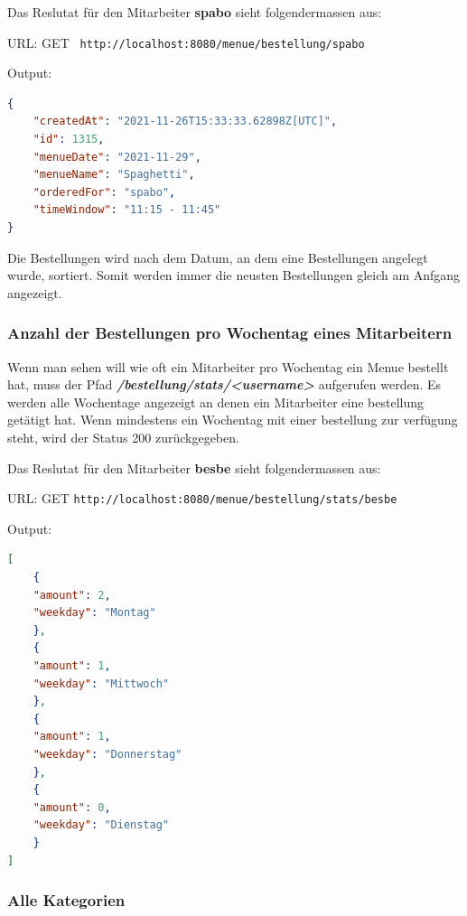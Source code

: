 Das Reslutat für den Mitarbeiter \textbf{spabo} sieht folgendermassen aus:


URL: GET \colorbox{white}{\lstinline[basicstyle=\ttfamily\color{black},language=html]| http://localhost:8080/menue/bestellung/spabo|}


Output:

\begin{lstlisting}[language=json,firstnumber=1]
{
    "createdAt": "2021-11-26T15:33:33.62898Z[UTC]",
    "id": 1315,
    "menueDate": "2021-11-29",
    "menueName": "Spaghetti",
    "orderedFor": "spabo",
    "timeWindow": "11:15 - 11:45"
}
\end{lstlisting}

Die Bestellungen wird nach dem Datum, an dem eine Bestellungen angelegt wurde, sortiert. Somit werden immer die neusten Bestellungen gleich am Anfgang angezeigt.

\pagebreak

\subsubsection{Anzahl der Bestellungen pro Wochentag eines Mitarbeitern}

Wenn man sehen will wie oft ein Mitarbeiter pro Wochentag ein Menue bestellt hat, muss der Pfad \textbf{\textit{/bestellung/stats/<username>}} aufgerufen werden.
Es werden alle Wochentage angezeigt an denen ein Mitarbeiter eine bestellung getätigt hat. Wenn mindestens ein Wochentag mit einer bestellung zur verfügung steht, 
wird der Status 200 zurückgegeben.

Das Reslutat für den Mitarbeiter \textbf{besbe} sieht folgendermassen aus:


URL: GET \colorbox{white}{\lstinline[basicstyle=\ttfamily\color{black},language=html]|http://localhost:8080/menue/bestellung/stats/besbe|}


Output:

\begin{lstlisting}[language=json,firstnumber=1]
[
    {
    "amount": 2,
    "weekday": "Montag"
    },
    {
    "amount": 1,
    "weekday": "Mittwoch"
    },
    {
    "amount": 1,
    "weekday": "Donnerstag"
    },
    {
    "amount": 0,
    "weekday": "Dienstag"
    }
]
\end{lstlisting}

\pagebreak

\subsubsection{Alle Kategorien}

